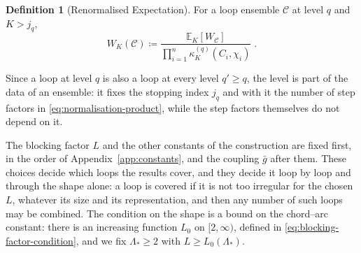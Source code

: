 \documentclass[11pt]{preprint}
\numberwithin{equation}{section}
\theoremstyle{definition}
\newtheorem{definition}[theorem]{Definition}
\theoremstyle{remark}
\theoremstyle{plain}
\begin{document}
\begin{definition}[Renormalised Expectation]\label{def:renormalised-expectation}
For a loop ensemble $\mathcal C$ at level $q$ and $K > j_q$,
\begin{equation}\label{eq:renormalised-expectation}
    W_K(\mathcal C) \coloneqq \frac{\mathbb E_K[W_{\mathcal C}]}{\prod_{i=1}^{n}\kappa_K^{(q)}(C_i, \chi_i)}\;.
\end{equation}
\end{definition}

Since a loop at level $q$ is also a loop at every level $q' \geq q$, the level is part of the data of an ensemble: it fixes the stopping index $j_q$ and with it the number of step factors in \eqref{eq:normalisation-product}, while the step factors themselves do not depend on it.

The blocking factor $L$ and the other constants of the construction are fixed first, in the order of Appendix~\ref{app:constants}, and the coupling $\bar g$ after them. These choices decide which loops the results cover, and they decide it loop by loop and through the shape alone: a loop is covered if it is not too irregular for the chosen $L$, whatever its size and its representation, and then any number of such loops may be combined. The condition on the shape is a bound on the chord--arc constant: there is an increasing function $L_0$ on $[2, \infty)$, defined in \eqref{eq:blocking-factor-condition}, and we fix $\Lambda_* \geq 2$ with $L \geq L_0(\Lambda_*)$.
\end{document}
